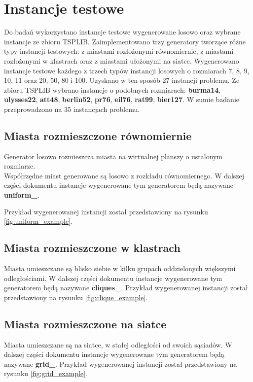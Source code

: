 \section{Instancje testowe}
Do badań wykorzystano instancje testowe wygenerowane losowo oraz wybrane instancje ze zbioru TSPLIB.
Zaimplementowano trzy generatory tworzące różne typy instancji testowych: z miastami rozłożonymi równomiernie,
z miastami rozłożonymi w klastrach oraz z miastami ułożonymi na siatce.
Wygenerowano instancje testowe każdego z trzech typów instancji losowych o rozmiarach 7, 8, 9, 10, 11 oraz 20, 50, 80 i 100.
Uzyskano w ten sposób 27 instancji problemu.
Ze zbioru TSPLIB wybrano instancje o podobnych rozmiarach: \textbf{burma14}, \textbf{ulysses22}, \textbf{att48}, \textbf{berlin52}, \textbf{pr76}, \textbf{eil76}, \textbf{rat99},
\textbf{bier127}.
W sumie badanie przeprowadzono na 35 instancjach problemu.

\subsection*{Miasta rozmieszczone równomiernie}
Generator losowo rozmieszcza miasta na wirtualnej planszy o ustalonym rozmiarze.\\
Współrzędne miast generowane są losowo z rozkładu równomiernego.
W dalszej części dokumentu instancje wygenerowane tym generatorem będą nazywane \textbf{uniform\_<liczba miast>}.

Przykład wygenerowanej instancji został przedstawiony na rysunku \ref{fig:uniform_example}.

\subsection*{Miasta rozmieszczone w klastrach}
Miasta umieszczane są blisko siebie w kilku grupach oddzielonych większymi odległościami.
W dalszej części dokumentu instancje wygenerowane tym generatorem będą nazywane \textbf{cliques\_<liczba miast>}.
Przykład wygenerowanej instancji został przedstawiony na rysunku \ref{fig:clique_example}.


\subsection*{Miasta rozmieszczone na siatce}
Miasta umieszczane są na siatce, w stałej odległości od swoich sąsiadów.
W dalszej części dokumentu instancje wygenerowane tym generatorem będą nazywane \textbf{grid\_<liczba miast>}.
Przykład wygenerowanej instancji został przedstawiony na rysunku \ref{fig:grid_example}.


